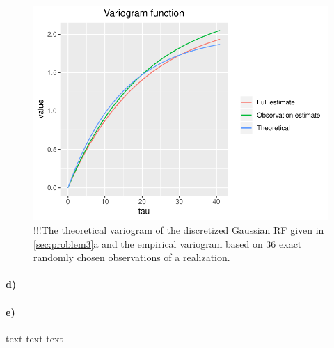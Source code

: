 \begin{figure}
    \centering
    \includegraphics[scale=0.95]{figures/3c_variogram_estimates.pdf}
    \caption{!!!The theoretical variogram of the discretized Gaussian RF given in \ref{sec:problem3}a and the empirical variogram based on 36 exact randomly chosen observations of a realization.}
    \label{fig:3c_variogram_estimates}
\end{figure}

\paragraph{d)}

\paragraph{e)}
text text text
